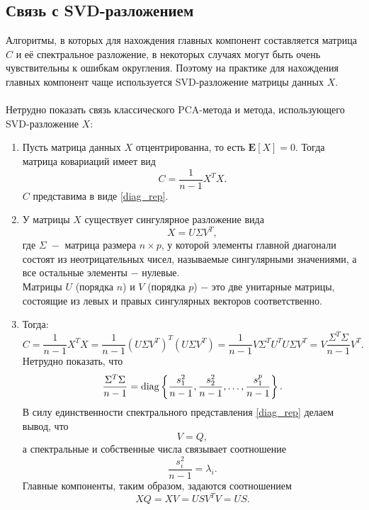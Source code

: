 \documentclass[a4paper]{article}
\begin{document}
\subsection{Связь с SVD-разложением}
Алгоритмы, в которых для нахождения главных компонент составляется матрица $C$ и её спектральное разложение, в некоторых случаях могут быть очень чувствительны к ошибкам округления\cite{book1}. Поэтому на практике для нахождения главных компонент чаще используется SVD-разложение матрицы данных $X$.\\\\
Нетрудно показать связь классического PCA-метода и метода, использующего SVD-разложение $X$:
\begin{enumerate}
    \item Пусть матрица данных $X$ отцентрированна, то есть $\mathbf{E}\left[X\right]=0$. Тогда матрица ковариаций имеет вид 
    \begin{equation}
        C=\dfrac{1}{n-1}X^TX.
    \end{equation}
    $C$ представима в виде \eqref{diag_rep}.
    \item У матрицы $X$ существует сингулярное разложение вида
    \begin{equation}
        X=U\Sigma V^T,
    \end{equation}
    где $\Sigma\;-$ матрица размера $n\times p$, у которой элементы главной диагонали состоят из неотрицательных чисел, называемые сингулярными значениями, а все остальные элементы $-$ нулевые.\\
    Матрицы $U$ (порядка $n$) и $V$ (порядка $p$) $-$ это две унитарные матрицы, состоящие из левых и правых сингулярных векторов соответственно.
    \item Тогда:
    \begin{equation}
        C=\dfrac{1}{n-1}X^TX=\dfrac{1}{n-1}\left(U\Sigma V^T\right)^T\left(U\Sigma V^T\right)=\dfrac{1}{n-1}V\Sigma^T U^T U\Sigma V^T=V\dfrac{\Sigma^T\Sigma}{n-1}V^T.
    \end{equation}
    Нетрудно показать, что 
    \begin{equation}
        \dfrac{\Sigma^T\Sigma}{n-1}=\operatorname{diag}\left\{\dfrac{s_1^2}{n-1}, \dfrac{s_2^2}{n-1},\hdots, \dfrac{s_1^p}{n-1}\right\}.
    \end{equation}
    В силу единственности спектрального представления \eqref{diag_rep} делаем вывод, что
    \begin{equation}
        V=Q,
    \end{equation}
    а спектральные и собственные числа связывает соотношение
    \begin{equation}
        \dfrac{s_i^2}{n-1}=\lambda_i.
    \end{equation}
    Главные компоненты, таким образом, задаются соотношением
    \begin{equation}
        XQ=XV=USV^T V=US.
    \end{equation}
\end{enumerate}
\end{document}
